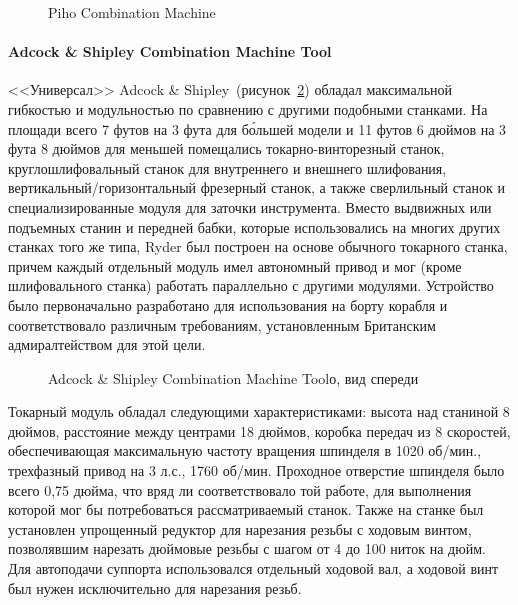 \begin{figure}[ht]
	\caption{Piho Combination Machine}\label{fig:piho}
\end{figure}

\paragraph{Adcock \& Shipley Combination Machine Tool}

<<Универсал>> Adcock \& Shipley~(рисунок~\cref{fig:adcock-1}) обладал максимальной гибкостью и модульностью по сравнению с другими подобными станками. На площади всего 7 футов на 3 фута для б\'ольшей модели и 11 футов 6 дюймов на 3 фута 8 дюймов для меньшей помещались токарно-винторезный станок, круглошлифовальный станок для внутреннего и внешнего шлифования, вертикальный/горизонтальный фрезерный станок, а также сверлильный станок и специализированные модуля для заточки инструмента. Вместо выдвижных или подъемных станин и передней бабки, которые использовались на многих других станках того же типа, Ryder был построен на основе обычного токарного станка, причем каждый отдельный модуль имел автономный привод и мог (кроме шлифовального станка) работать параллельно с другими модулями. Устройство было первоначально разработано для использования на борту корабля и соответствовало различным требованиям, установленным Британским адмиралтейством для этой цели. 

\begin{figure}[ht]
	\caption{Adcock \& Shipley Combination Machine Toolо, вид спереди}\label{fig:adcock-1}
\end{figure}

Токарный модуль обладал следующими характеристиками: высота над станиной 8 дюймов, расстояние между центрами 18 дюймов, коробка передач из 8 скоростей, обеспечивающая максимальную частоту вращения шпинделя в 1020 об/мин., трехфазный привод на 3 л.с., 1760 об/мин. Проходное отверстие шпинделя было всего 0,75 дюйма, что вряд ли соответствовало той работе, для выполнения которой мог бы потребоваться рассматриваемый станок. Также на станке был установлен упрощенный редуктор для нарезания резьбы с ходовым винтом, позволявшим нарезать дюймовые резьбы с шагом от 4 до 100 ниток на дюйм. Для автоподачи суппорта использовался отдельный ходовой вал, а ходовой винт был нужен исключительно для нарезания резьб.

